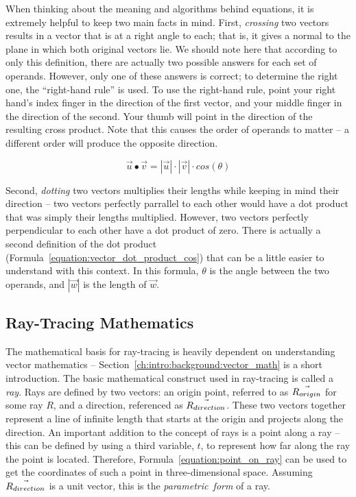 When thinking about the meaning and algorithms behind equations, it is extremely helpful to keep two main facts in mind.
First, {\it crossing} two vectors results in a vector that is at a right angle to each; that is, it gives a normal to the plane in which both original vectors lie.
We should note here that according to only this definition, there are actually two possible answers for each set of operands.
However, only one of these answers is correct; to determine the right one, the ``right-hand rule'' is used.
To use the right-hand rule, point your right hand's index finger in the direction of the first vector, and your middle finger in the direction of the second.
Your thumb will point in the direction of the resulting cross product.
Note that this causes the order of operands to matter -- a different order will produce the opposite direction.

\begin{equation}
  \label{equation:vector_dot_product_cos}
  \vec{u} \bullet \vec{v} = |\vec{u}| \cdot |\vec{v}| \cdot cos(\theta)
\end{equation}

Second, {\it dotting} two vectors multiplies their lengths while keeping in mind their direction -- two vectors perfectly parrallel to each other would have a dot product that was simply their lengths multiplied.
However, two vectors perfectly perpendicular to each other have a dot product of zero.
There is actually a second definition of the dot product (Formula~\ref{equation:vector_dot_product_cos}) that can be a little easier to understand with this context.
In this formula, $\theta$ is the angle between the two operands, and $|\vec{w}|$ is the length of $\vec{w}$.

\subsection{Ray-Tracing Mathematics}
\label{ch:intro:background:raytracing_math}

The mathematical basis for ray-tracing is heavily dependent on understanding vector mathematics -- Section~\ref{ch:intro:background:vector_math} is a short introduction.
The basic mathematical construct used in ray-tracing is called a {\it ray}.
Rays are defined by two vectors: an origin point, referred to as $\vec{R_{origin}}$ for some ray $R$, and a direction, referenced as $\vec{R_{direction}}$.
These two vectors together represent a line of infinite length that starts at the origin and projects along the direction.
An important addition to the concept of rays is a point along a ray -- this can be defined by using a third variable, $t$, to represent how far along the ray the point is located.
Therefore, Formula~\ref{equation:point_on_ray} can be used to get the coordinates of such a point in three-dimensional space.
Assuming $\vec{R_{direction}}$ is a unit vector, this is the {\it parametric~form} of a ray.

